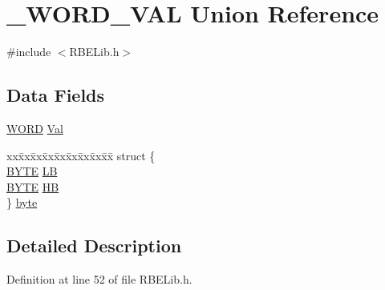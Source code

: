 \hypertarget{union___w_o_r_d___v_a_l}{\section{\+\_\+\+W\+O\+R\+D\+\_\+\+V\+A\+L Union Reference}
\label{union___w_o_r_d___v_a_l}
}


{\ttfamily \#include $<$R\+B\+E\+Lib.\+h$>$}

\subsection*{Data Fields}
\begin{DoxyCompactItemize}
\item 
\hyperlink{_r_b_e_lib_8h_a4cfc63e05db4883dc4b60a1245a9ffc5}{W\+O\+R\+D} \hyperlink{union___w_o_r_d___v_a_l_a3b0f626d2e15ff5aa21804dd598d23c9}{Val}
\item 
\begin{tabbing}
xx\=xx\=xx\=xx\=xx\=xx\=xx\=xx\=xx\=\kill
struct \{\\
\>\hyperlink{_r_b_e_lib_8h_aec93e83855ac17c3c25c55c37ca186dd}{BYTE} \hyperlink{union___w_o_r_d___v_a_l_aa012d9c31fb3018cbe4d6a5052d98f51}{LB}\\
\>\hyperlink{_r_b_e_lib_8h_aec93e83855ac17c3c25c55c37ca186dd}{BYTE} \hyperlink{union___w_o_r_d___v_a_l_a912b51805454255a794b26e6646c0cf1}{HB}\\
\} \hyperlink{union___w_o_r_d___v_a_l_ad7a0075252b41d01f900c602d940e0aa}{byte}\\

\end{tabbing}\end{DoxyCompactItemize}


\subsection{Detailed Description}


Definition at line 52 of file R\+B\+E\+Lib.\+h.



